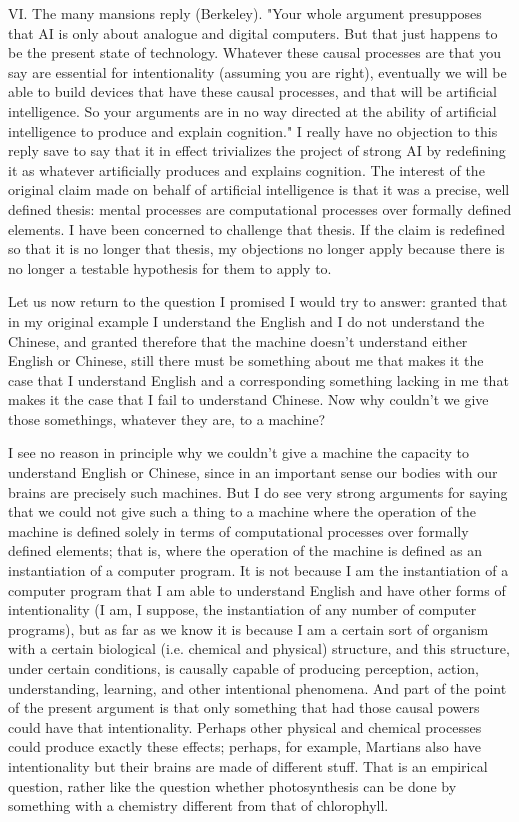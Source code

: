 VI. The many mansions reply (Berkeley). "Your whole argument presupposes that AI is only about analogue
and digital computers. But that just happens to be the present state of technology. Whatever these causal
processes are that you say are essential for intentionality (assuming you are right), eventually we will be able to
build devices that have these causal processes, and that will be artificial intelligence. So your arguments are in
no way directed at the ability of artificial intelligence to produce and explain cognition."
I really have no objection to this reply save to say that it in effect trivializes the project of strong AI by
redefining it as whatever artificially produces and explains cognition. The interest of the original claim made on
behalf of artificial intelligence is that it was a precise, well defined thesis: mental processes are computational
processes over formally defined elements. I have been concerned to challenge that thesis. If the claim is
redefined so that it is no longer that thesis, my objections no longer apply because there is no longer a testable
hypothesis for them to apply to.

Let us now return to the question I promised I would try to answer: granted that in my original example I
understand the English and I do not understand the Chinese, and granted therefore that the machine doesn't
understand either English or Chinese, still there must be something about me that makes it the case that I
understand English and a corresponding something lacking in me that makes it the case that I fail to understand
Chinese. Now why couldn't we give those somethings, whatever they are, to a machine?

I see no reason in principle why we couldn't give a machine the capacity to understand English or Chinese,
since in an important sense our bodies with our brains are precisely such machines. But I do see very strong
arguments for saying that we could not give such a thing to a machine where the operation of the machine is
defined solely in terms of computational processes over formally defined elements; that is, where the operation
of the machine is defined as an instantiation of a computer program. It is not because I am the instantiation of a
computer program that I am able to understand English and have other forms of intentionality (I am, I suppose,
the instantiation of any number of computer programs), but as far as we know it is because I am a certain sort
of organism with a certain biological (i.e. chemical and physical) structure, and this structure, under certain
conditions, is causally capable of producing perception, action, understanding, learning, and other intentional
phenomena. And part of the point of the present argument is that only something that had those causal powers
could have that intentionality. Perhaps other physical and chemical processes could produce exactly these
effects; perhaps, for example, Martians also have intentionality but their brains are made of different stuff. That
is an empirical question, rather like the question whether photosynthesis can be done by something with a
chemistry different from that of chlorophyll.

